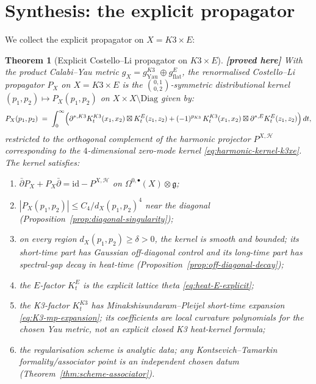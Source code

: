 \documentclass[11pt]{amsart}
\providecommand{\ClaimStatusProvedHere}[1][]{\textbf{[proved here]}}
\providecommand{\dbar}{\bar\partial}
\providecommand{\frakg}{\mathfrak{g}}
\providecommand{\Diag}{\mathrm{Diag}}
\newtheorem{theorem}{Theorem}[section]
\theoremstyle{definition}
\theoremstyle{remark}
\begin{document}
\section{Synthesis: the explicit propagator}
\label{sec:synthesis}

We collect the explicit propagator on $X = K3 \times E$:

\begin{theorem}[Explicit Costello--Li propagator on $K3 \times E$]
\label{thm:main-explicit-propagator}
\ClaimStatusProvedHere
With the product Calabi--Yau metric $g_X = g_{\mathrm{Yau}}^{K3}
\oplus g_{\mathrm{flat}}^E$, the renormalised Costello--Li
propagator $P_X$ on $X = K3 \times E$ is the
$\binom{0,1}{0,2}$-symmetric distributional kernel
$(p_1,p_2) \mapsto P_X(p_1,p_2)$
on $X \times X \setminus \Diag$ given by:
\begin{equation}
  \label{eq:propagator-explicit-final}
  P_X(p_1,p_2)
  \;=\;
  \int_0^\infty
  \Bigl(
    \dbar^{*,K3} K^{K3}_t(x_1,x_2) \boxtimes K^E_t(z_1,z_2)
    + (-1)^{p_{K3}}\,
    K^{K3}_t(x_1,x_2) \boxtimes \dbar^{*,E} K^E_t(z_1,z_2)
  \Bigr)\,dt,
\end{equation}
restricted to the orthogonal complement of the harmonic projector
$P^{X,\mathcal H}$ corresponding to the $4$-dimensional
zero-mode kernel \eqref{eq:harmonic-kernel-k3xe}. The kernel
satisfies:
\begin{enumerate}[label=\textup{(\roman*)}]
\item $\dbar P_X + P_X \dbar = \mathrm{id} - P^{X,\mathcal H}$
on $\Omega^{0,\bullet}(X) \otimes \frakg$;
\item $|P_X(p_1,p_2)| \leq C_4 / d_X(p_1,p_2)^4$ near the diagonal
(Proposition~\ref{prop:diagonal-singularity});
\item on every region $d_X(p_1,p_2)\geq\delta>0$, the kernel is smooth
and bounded; its short-time part has Gaussian off-diagonal control and
its long-time part has spectral-gap decay in heat-time
(Proposition~\ref{prop:off-diagonal-decay});
\item the $E$-factor $K^E_t$ is the explicit lattice theta
\eqref{eq:heat-E-explicit};
\item the K3-factor $K^{K3}_t$ has Minakshisundaram--Pleijel
short-time expansion \eqref{eq:K3-mp-expansion}; its coefficients are
local curvature polynomials for the chosen Yau metric, not an explicit
closed K3 heat-kernel formula;
\item the regularisation scheme is analytic data; any
Kontsevich--Tamarkin formality/associator point is an independent
chosen datum (Theorem~\ref{thm:scheme-associator}).
\end{enumerate}
\end{theorem}
\end{document}
